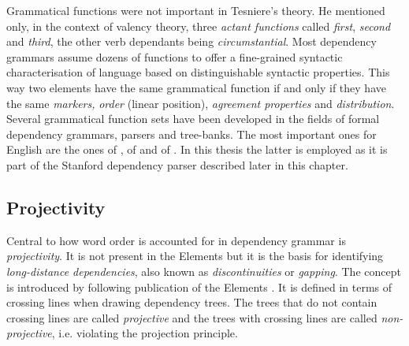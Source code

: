     Grammatical functions were not important in Tesniere's theory. He mentioned only, in the context of valency theory, three \textit{actant functions} called \textit{first}, \textit{second} and \textit{third}, the other verb dependants being \textit{circumstantial}. Most dependency grammars assume dozens of functions to offer a fine-grained syntactic characterisation of language based on distinguishable syntactic properties. This way two elements have the same grammatical function if and only if they have the same \textit{markers,} \textit{order} (linear position), \textit{agreement properties} and \textit{distribution}. Several grammatical function sets have been developed in the fields of formal dependency grammars, parsers and tree-banks. The most important ones for English are the ones of \citet{MelcukPertsov86}, of \citet{Johnson2000} and of \citet{Marneffe2008, Marneffe2008a}. In this thesis the latter is employed as it is part of the Stanford dependency parser described later in this chapter. 

\subsection{Projectivity}
    Central to how word order is accounted for in dependency grammar is \textit{projectivity}. It is not present in the Elements but it is the basis for identifying \textit{long-distance dependencies}, also known as \textit{discontinuities} or \textit{gapping}. The concept is introduced by \citet{Lecerf1961} following publication of the Elements \citep{Tesniere59}. It is defined in terms of crossing lines when drawing dependency trees. The trees that do not contain crossing lines are called \textit{projective} and the trees with crossing lines are called \textit{non-projective}, i.e. violating the projection principle. 

